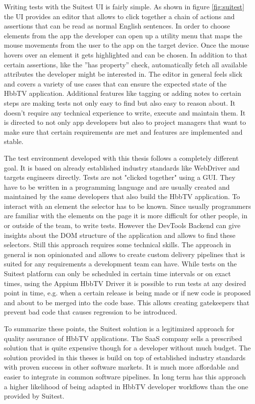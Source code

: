 Writing tests with the Suitest UI is fairly simple. As shown in figure \ref{fig:suitest} the UI provides an editor
that allows to click together a chain of actions and assertions that can be read as normal English sentences. In
order to choose elements from the app the developer can open up a utility menu that maps the mouse movements from the
user to the app on the target device. Once the mouse hovers over an element it gets highlighted and can be chosen.
In addition to that certain assertions, like the ''has property'' check, automatically fetch all available attributes
the developer might be interested in. The editor in general feels slick and covers a variety of use cases that can
ensure the expected state of the HbbTV application. Additional features like tagging or adding notes to certain steps
are making tests not only easy to find but also easy to reason about. It doesn't require any technical experience
to write, execute and maintain them. It is directed to not only app developers but also to project managers that want
to make sure that certain requirements are met and features are implemented and stable.

The test environment developed with this thesis follows a completely different goal. It is based on already established
industry standards like WebDriver and targets engineers directly. Tests are not "clicked together" using a GUI. They have
to be written in a programming language and are usually created and maintained by the same developers that also build
the HbbTV application. To interact with an element the selector has to be known. Since usually programmers are familiar
with the elements on the page it is more difficult for other people, in or outside of the team, to write tests. However
the DevTools Backend can give insights about the DOM structure of the application and allows to find these selectors.
Still this approach requires some technical skills. The approach in general is non opinionated and allows to create
custom delivery pipelines that is suited for any requirements a development team can have. While tests on the Suitest
platform can only be scheduled in certain time intervals or on exact times, using the Appium HbbTV Driver it is
possible to run tests at any desired point in time, e.g. when a certain release is being made or if new code is
proposed and about to be merged into the code base. This allows creating gatekeepers that prevent bad code that
causes regression to be introduced.

To summarize these points, the Suitest solution is a legitimized approach for quality assurance of HbbTV applications.
The SaaS company sells a prescribed solution that is quite expensive though for a developer without much budget. The
solution provided in this theses is build on top of established industry standards with proven success in other
software markets. It is much more affordable and easier to integrate in common software pipelines. In long term has this
approach a higher likelihood of being adapted in HbbTV developer workflows than the one provided by Suitest.
